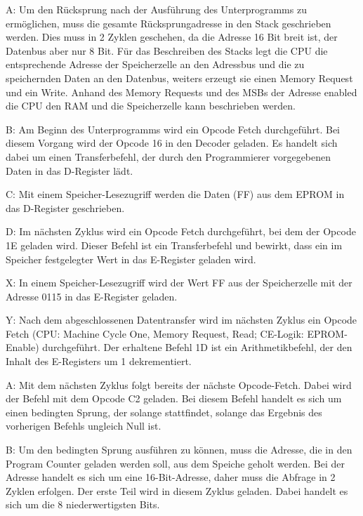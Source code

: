 A: Um den Rücksprung nach der Ausführung des Unterprogramms zu ermöglichen, muss die gesamte Rücksprungadresse in den Stack geschrieben werden. Dies muss in 2 Zyklen geschehen, da die Adresse 16 Bit breit ist, der Datenbus aber nur 8 Bit. Für das Beschreiben des Stacks legt die CPU die entsprechende Adresse der Speicherzelle an den Adressbus und die zu speichernden Daten an den Datenbus, weiters erzeugt sie einen Memory Request und ein Write. Anhand des Memory Requests und des MSBs der Adresse enabled die CPU den RAM und die Speicherzelle kann beschrieben werden.

B: Am Beginn des Unterprogramms wird ein Opcode Fetch durchgeführt. Bei diesem Vorgang wird der Opcode 16 in den Decoder geladen. Es handelt sich dabei um einen Transferbefehl, der durch den Programmierer vorgegebenen Daten in das D-Register lädt.

C: Mit einem Speicher-Lesezugriff werden die Daten (FF) aus dem EPROM in das D-Register geschrieben.

D: Im nächsten Zyklus wird ein Opcode Fetch durchgeführt, bei dem der Opcode 1E geladen wird. Dieser Befehl ist ein Transferbefehl und bewirkt, dass ein im Speicher festgelegter Wert in das E-Register geladen wird.

X: In einem Speicher-Lesezugriff wird der Wert FF aus der Speicherzelle mit der Adresse 0115 in das E-Register geladen.

Y: Nach dem abgeschlossenen Datentransfer wird im nächsten Zyklus ein Opcode Fetch (CPU: Machine Cycle One, Memory Request, Read; CE-Logik: EPROM-Enable) durchgeführt. Der erhaltene Befehl 1D ist ein Arithmetikbefehl, der den Inhalt des E-Registers um 1 dekrementiert.

A: Mit dem nächsten Zyklus folgt bereits der nächste Opcode-Fetch. Dabei wird der Befehl mit dem Opcode C2 geladen. Bei diesem Befehl handelt es sich um einen bedingten Sprung, der solange stattfindet, solange das Ergebnis des vorherigen Befehls ungleich Null ist.

B: Um den bedingten Sprung ausführen zu können, muss die Adresse, die in den Program Counter geladen werden soll, aus dem Speiche geholt werden. Bei der Adresse handelt es sich um eine 16-Bit-Adresse, daher muss die Abfrage in 2 Zyklen erfolgen. Der erste Teil wird in diesem Zyklus geladen. Dabei handelt es sich um die 8 niederwertigsten Bits.

